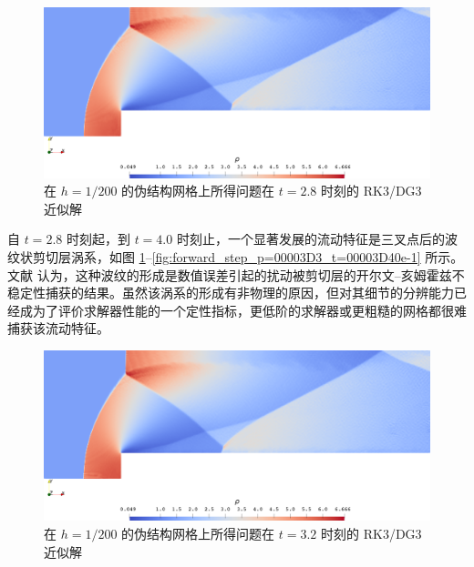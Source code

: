 \begin{figure}[h!]
\begin{centering}
\includegraphics[width=1\textwidth,height=0.28\textheight]{../mdpi/figures/forward_step/p=3_t=28e-1}
\par\end{centering}
\caption{\label{fig:forward_step_p=00003D3_t=00003D28e-1}在 $h=1/200$ 的伪结构网格上所得问题在
$t=2.8$ 时刻的 RK3/DG3 近似解}
\end{figure}

自 $t=2.8$ 时刻起，到 $t=4.0$ 时刻止，一个显著发展的流动特征是三叉点后的波纹状剪切层涡系，如图 \ref{fig:forward_step_p=00003D3_t=00003D28e-1}–\ref{fig:forward_step_p=00003D3_t=00003D40e-1}
所示。文献 \cite{Woodward_1984} 认为，这种波纹的形成是数值误差引起的扰动被剪切层的开尔文–亥姆霍兹不稳定性捕获的结果。虽然该涡系的形成有非物理的原因，但对其细节的分辨能力已经成为了评价求解器性能的一个定性指标，更低阶的求解器或更粗糙的网格都很难捕获该流动特征。

\begin{figure}[h!]
\begin{centering}
\includegraphics[width=1\textwidth,height=0.28\textheight]{../mdpi/figures/forward_step/p=3_t=32e-1}
\par\end{centering}
\caption{\label{fig:forward_step_p=00003D3_t=00003D32e-1}在 $h=1/200$ 的伪结构网格上所得问题在
$t=3.2$ 时刻的 RK3/DG3 近似解}
\end{figure}

